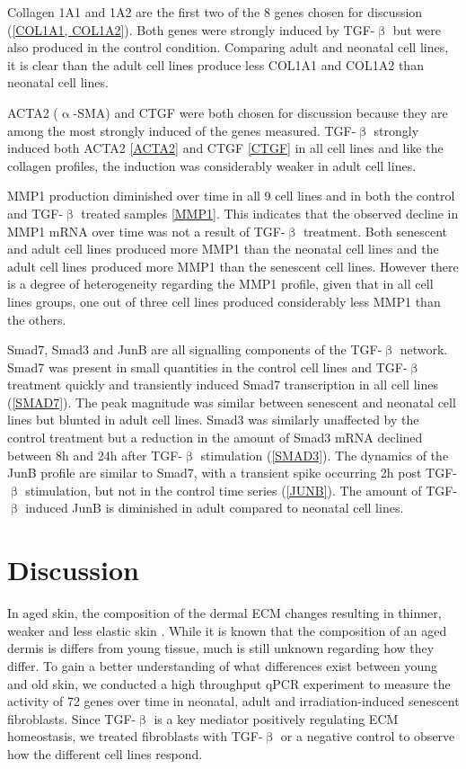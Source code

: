 \documentclass[alpha-refs]{wiley-article}
\newcommand{\tgf}{TGF-$\upbeta$}
\begin{document}
Collagen 1A1 and 1A2 are the first two of the 8 genes chosen for discussion (\cref{COL1A1, COL1A2}). Both genes were strongly induced by \tgf{} but were also produced in the control condition. Comparing adult and neonatal cell lines, it is clear than the adult cell lines produce less COL1A1 and COL1A2 than neonatal cell lines. 

ACTA2 ($\upalpha$-SMA) and CTGF were both chosen for discussion because they are among the most strongly induced of the genes measured. \tgf{} strongly induced both ACTA2 \cref{ACTA2} and CTGF \cref{CTGF} in all cell lines and like the collagen profiles, the induction was considerably weaker in adult cell lines. 

MMP1 production diminished over time in all 9 cell lines and in both the control and \tgf{} treated samples \cref{MMP1}. This indicates that the observed decline in MMP1 mRNA over time was not a result of \tgf{} treatment. Both senescent and adult cell lines produced more MMP1 than the neonatal cell lines and the adult cell lines produced more MMP1 than the senescent cell lines. However there is a degree of heterogeneity regarding the MMP1 profile, given that in all cell lines groups, one out of three cell lines produced considerably less MMP1 than the others. 

Smad7, Smad3 and JunB are all signalling components of the \tgf{} network. Smad7 was present in small quantities in the control cell lines and \tgf{} treatment quickly and transiently induced Smad7 transcription in all cell lines (\cref{SMAD7}). The peak magnitude was similar between senescent and neonatal cell lines but blunted in adult cell lines. Smad3 was similarly unaffected by the control treatment but a reduction in the amount of Smad3 mRNA declined between 8h and 24h after \tgf{} stimulation (\cref{SMAD3}). The dynamics of the JunB profile are similar to Smad7, with a transient spike occurring 2h post \tgf{} stimulation, but not in the control time series (\cref{JUNB}). The amount of \tgf{} induced JunB is diminished in adult compared to neonatal cell lines. 

\section{Discussion}
In aged skin, the composition of the dermal ECM changes resulting in thinner, weaker and less elastic skin \citep{Farage2009}. While it is known that the composition of an aged dermis is differs from young tissue, much is still unknown regarding how they differ. To gain a better understanding of what differences exist between young and old skin, we conducted a high throughput qPCR experiment to measure the activity of 72 genes over time in neonatal, adult and irradiation-induced senescent fibroblasts. Since \tgf{} is a key mediator positively regulating ECM homeostasis, we treated fibroblasts with \tgf{} or a negative control to observe how the different cell lines respond. 
\end{document}
